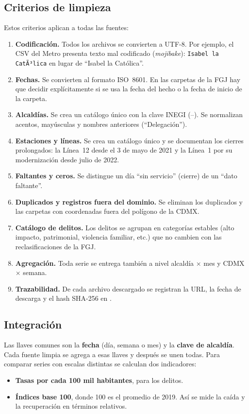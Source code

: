 \subsection{Criterios de limpieza}
Estos criterios aplican a todas las fuentes:
\begin{enumerate}
  \item \textbf{Codificación.} Todos los archivos se convierten a UTF-8. Por ejemplo, el CSV del Metro
        presenta texto mal codificado (\emph{mojibake}): \texttt{Isabel la CatÃ³lica} en lugar de
        \enquote{Isabel la Católica}.
  \item \textbf{Fechas.} Se convierten al formato ISO~8601. En las carpetas de la FGJ hay que decidir
        explícitamente si se usa la fecha del hecho o la fecha de inicio de la carpeta.
  \item \textbf{Alcaldías.} Se crea un catálogo único con la clave INEGI (--).
        Se normalizan acentos, mayúsculas y nombres anteriores (\enquote{Delegación}).
  \item \textbf{Estaciones y líneas.} Se crea un catálogo único y se documentan los cierres prolongados:
        la Línea~12 desde el 3 de mayo de 2021 y la Línea~1 por su modernización desde julio de 2022.
  \item \textbf{Faltantes y ceros.} Se distingue un día \enquote{sin servicio} (cierre) de un \enquote{dato faltante}.
  \item \textbf{Duplicados y registros fuera del dominio.} Se eliminan los duplicados y las carpetas
        con coordenadas fuera del polígono de la CDMX.
  \item \textbf{Catálogo de delitos.} Los delitos se agrupan en categorías estables (alto impacto,
        patrimonial, violencia familiar, etc.) que no cambien con las reclasificaciones de la FGJ.
  \item \textbf{Agregación.} Toda serie se entrega también a nivel alcaldía × mes y CDMX × semana.
  \item \textbf{Trazabilidad.} De cada archivo descargado se registran la URL, la fecha de descarga
        y el hash SHA-256 en .
\end{enumerate}

\subsection{Integración}
Las llaves comunes son la \textbf{fecha} (día, semana o mes) y la \textbf{clave de alcaldía}.
Cada fuente limpia se agrega a esas llaves y después se unen todas. Para comparar series con escalas
distintas se calculan dos indicadores:
\begin{itemize}
  \item \textbf{Tasas por cada 100 mil habitantes}, para los delitos.
  \item \textbf{Índices base 100}, donde 100 es el promedio de 2019. Así se mide la caída y la
        recuperación en términos relativos.
\end{itemize}
